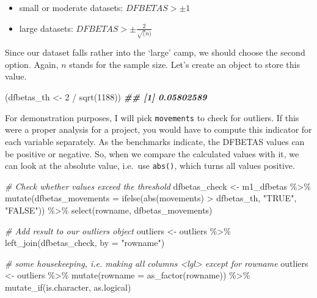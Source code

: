 \documentclass[
]{book}
\newenvironment{Shaded}{\begin{snugshade}}{\end{snugshade}}
\newcommand{\AttributeTok}[1]{\textcolor[rgb]{0.77,0.63,0.00}{#1}}
\newcommand{\CommentTok}[1]{\textcolor[rgb]{0.56,0.35,0.01}{\textit{#1}}}
\newcommand{\DecValTok}[1]{\textcolor[rgb]{0.00,0.00,0.81}{#1}}
\newcommand{\DocumentationTok}[1]{\textcolor[rgb]{0.56,0.35,0.01}{\textbf{\textit{#1}}}}
\newcommand{\FunctionTok}[1]{\textcolor[rgb]{0.00,0.00,0.00}{#1}}
\newcommand{\NormalTok}[1]{#1}
\newcommand{\OtherTok}[1]{\textcolor[rgb]{0.56,0.35,0.01}{#1}}
\newcommand{\SpecialCharTok}[1]{\textcolor[rgb]{0.00,0.00,0.00}{#1}}
\newcommand{\StringTok}[1]{\textcolor[rgb]{0.31,0.60,0.02}{#1}}
\begin{document}
\begin{itemize}
\item
  small or moderate datasets: \(DFBETAS > \pm 1\)
\item
  large datasets: \(DFBETAS > \pm\frac{2}{\sqrt(n)}\)
\end{itemize}

Since our dataset falls rather into the `large' camp, we should choose the second option. Again, \(n\) stands for the sample size. Let's create an object to store this value.

\begin{Shaded}
\begin{Highlighting}[]
\NormalTok{(dfbetas\_th }\OtherTok{\textless{}{-}} \DecValTok{2} \SpecialCharTok{/} \FunctionTok{sqrt}\NormalTok{(}\DecValTok{1188}\NormalTok{))}
\DocumentationTok{\#\# [1] 0.05802589}
\end{Highlighting}
\end{Shaded}

For demonstration purposes, I will pick \texttt{movements} to check for outliers. If this were a proper analysis for a project, you would have to compute this indicator for each variable separately. As the benchmarks indicate, the DFBETAS values can be positive or negative. So, when we compare the calculated values with it, we can look at the absolute value, i.e.~use \texttt{abs()}, which turns all values positive.

\begin{Shaded}
\begin{Highlighting}[]
\CommentTok{\# Check whether values exceed the threshold}
\NormalTok{dfbetas\_check }\OtherTok{\textless{}{-}}\NormalTok{ m1\_dfbetas }\SpecialCharTok{\%\textgreater{}\%}
  \FunctionTok{mutate}\NormalTok{(}\AttributeTok{dfbetas\_movements =} \FunctionTok{ifelse}\NormalTok{(}\FunctionTok{abs}\NormalTok{(movements) }\SpecialCharTok{\textgreater{}}\NormalTok{ dfbetas\_th,}
                                \StringTok{"TRUE"}\NormalTok{,}
                                \StringTok{"FALSE"}\NormalTok{)) }\SpecialCharTok{\%\textgreater{}\%}
  \FunctionTok{select}\NormalTok{(rowname, dfbetas\_movements)}

\CommentTok{\# Add result to our outliers object}
\NormalTok{outliers }\OtherTok{\textless{}{-}}\NormalTok{ outliers }\SpecialCharTok{\%\textgreater{}\%} \FunctionTok{left\_join}\NormalTok{(dfbetas\_check, }\AttributeTok{by =} \StringTok{"rowname"}\NormalTok{)}

\CommentTok{\# some housekeeping, i.e. making all columns \textless{}lgl\textgreater{} except for rowname}
\NormalTok{outliers }\OtherTok{\textless{}{-}}\NormalTok{ outliers }\SpecialCharTok{\%\textgreater{}\%}
  \FunctionTok{mutate}\NormalTok{(}\AttributeTok{rowname =} \FunctionTok{as\_factor}\NormalTok{(rowname)) }\SpecialCharTok{\%\textgreater{}\%}
  \FunctionTok{mutate\_if}\NormalTok{(is.character, as.logical)}
\end{Highlighting}
\end{Shaded}
\end{document}
